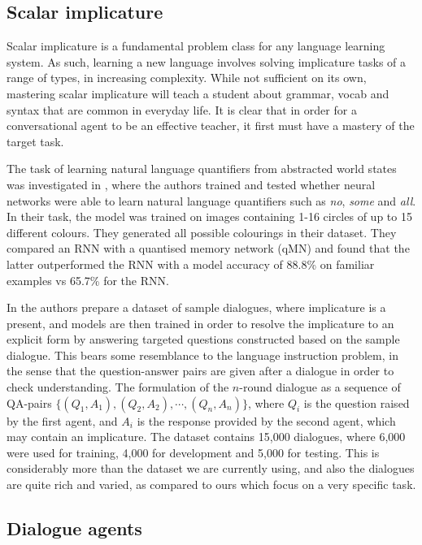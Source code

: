 \subsection{Scalar implicature}

Scalar implicature \cite{grice1975logic} is a fundamental problem class for any language learning system. As such, learning a new language involves solving implicature tasks of a range of types, in increasing complexity. While not sufficient on its own, mastering scalar implicature will teach a student about grammar, vocab and syntax that are common in everyday life. It is clear that in order for a conversational agent to be an effective teacher, it first must have a mastery of the target task.

The task of learning natural language quantifiers from abstracted world states was investigated in \cite{sorodoc2016look}, where the authors trained and tested whether neural networks were able to learn natural language quantifiers such as \textit{no}, \textit{some} and \textit{all}. In their task, the model was trained on images containing 1-16 circles of up to 15 different colours. They generated all possible colourings in their dataset. They compared an RNN with a quantised memory network (qMN) and found that the latter outperformed the RNN with a model accuracy of 88.8\% on familiar examples vs 65.7\% for the RNN.

In \cite{zheng2021grice} the authors prepare a dataset of sample dialogues, where implicature is a present, and models are then trained in order to resolve the implicature to an explicit form by answering targeted questions constructed based on the sample dialogue. This bears some resemblance to the language instruction problem, in the sense that the question-answer pairs are given after a dialogue in order to check understanding. The formulation of the $n$-round dialogue as a sequence of QA-pairs $\{(Q_1, A_1), (Q_2, A_2), \cdots, (Q_n, A_n)\}$, where $Q_i$ is the question raised by the first agent, and $A_i$ is the response provided by the second agent, which may contain an implicature. The dataset contains 15,000 dialogues, where 6,000 were used for training, 4,000 for development and 5,000 for testing. This is considerably more than the dataset we are currently using, and also the dialogues are quite rich and varied, as compared to ours which focus on a very specific task.

\subsection{Dialogue agents}

